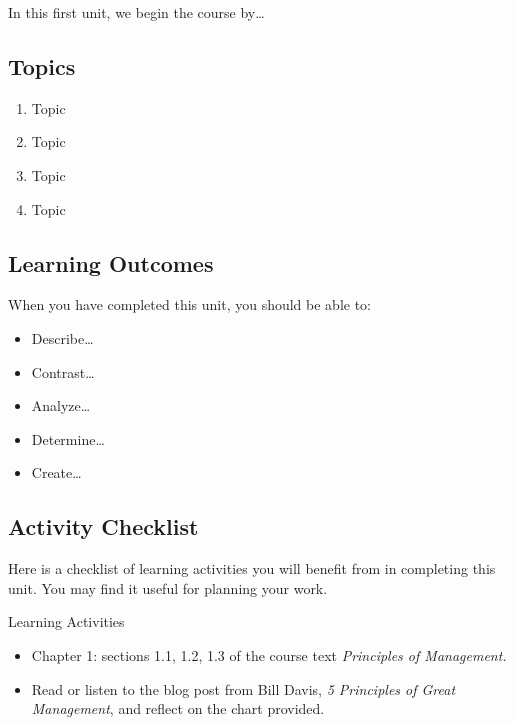 \documentclass[
]{book}
\providecommand{\tightlist}{%
  \setlength{\itemsep}{0pt}\setlength{\parskip}{0pt}}
\begin{document}
In this first unit, we begin the course by\ldots{}

\hypertarget{topics-2}{%
\subsection*{Topics}\label{topics-2}}

\begin{enumerate}
\def\labelenumi{\arabic{enumi}.}
\tightlist
\item
  Topic\\
\item
  Topic\\
\item
  Topic\\
\item
  Topic
\end{enumerate}

\hypertarget{learning-outcomes-2}{%
\subsection*{Learning Outcomes}\label{learning-outcomes-2}}

When you have completed this unit, you should be able to:

\begin{itemize}
\tightlist
\item
  Describe\ldots{}
\item
  Contrast\ldots{}
\item
  Analyze\ldots{}
\item
  Determine\ldots{}
\item
  Create\ldots{}
\end{itemize}

\hypertarget{activity-checklist-2}{%
\subsection*{Activity Checklist}\label{activity-checklist-2}}

Here is a checklist of learning activities you will benefit from in completing this unit. You may find it useful for planning your work.

\begin{reflect}
{Learning Activities }

\begin{itemize}
\tightlist
\item
  Chapter 1: sections 1.1, 1.2, 1.3 of the course text \emph{Principles of Management.}\\
\item
  Read or listen to the blog post from Bill Davis, \emph{5 Principles of Great Management}, and reflect on the chart provided.
\end{itemize}
\end{reflect}
\end{document}
